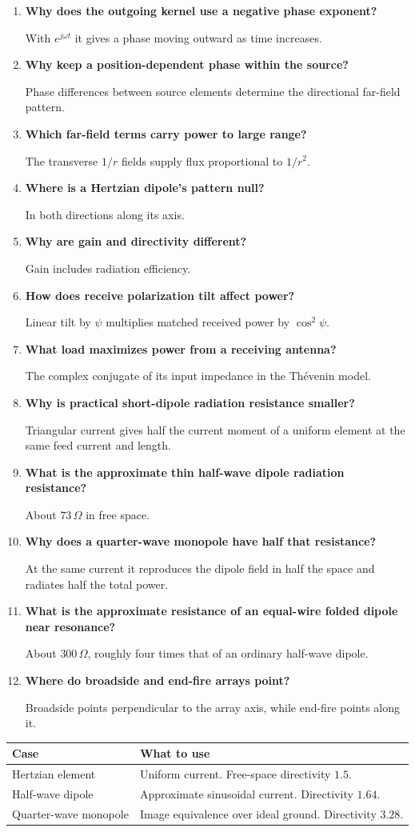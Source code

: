 \documentclass[12pt,a4paper]{article}
\newcommand{\Q}[1]{\textbf{#1}\par\noindent\ignorespaces}
\begin{document}
\begin{tcolorbox}[exambox,title={Frequently Asked / Viva Questions}]
\begin{enumerate}[topsep=0pt, label=\textbf{Q\arabic*.}, itemsep=5pt]
\item \Q{Why does the outgoing kernel use a negative phase exponent?}
With $e^{j\omega t}$ it gives a phase moving outward as time increases.
\item \Q{Why keep a position-dependent phase within the source?}
Phase differences between source elements determine the directional far-field pattern.
\item \Q{Which far-field terms carry power to large range?}
The transverse $1/r$ fields supply flux proportional to $1/r^2$.
\item \Q{Where is a Hertzian dipole's pattern null?}
In both directions along its axis.
\item \Q{Why are gain and directivity different?}
Gain includes radiation efficiency.
\item \Q{How does receive polarization tilt affect power?}
Linear tilt by $\psi$ multiplies matched received power by $\cos^2\psi$.
\item \Q{What load maximizes power from a receiving antenna?}
The complex conjugate of its input impedance in the Th\'evenin model.
\item \Q{Why is practical short-dipole radiation resistance smaller?}
Triangular current gives half the current moment of a uniform element at the same feed current and length.
\item \Q{What is the approximate thin half-wave dipole radiation resistance?}
About $73\,\Omega$ in free space.
\item \Q{Why does a quarter-wave monopole have half that resistance?}
At the same current it reproduces the dipole field in half the space and radiates half the total power.
\item \Q{What is the approximate resistance of an equal-wire folded dipole near resonance?}
About $300\,\Omega$, roughly four times that of an ordinary half-wave dipole.
\item \Q{Where do broadside and end-fire arrays point?}
Broadside points perpendicular to the array axis, while end-fire points along it.
\end{enumerate}
\end{tcolorbox}
\begin{tcolorbox}[tikzbox,title={Summary comparison}]
\begin{tabularx}{\linewidth}{|B{4cm}|Y|}\hline
\textbf{Case} & \textbf{What to use} \\ \hline
Hertzian element & Uniform current. Free-space directivity $1.5$. \\ \hline
Half-wave dipole & Approximate sinusoidal current. Directivity $1.64$. \\ \hline
Quarter-wave monopole & Image equivalence over ideal ground. Directivity $3.28$. \\ \hline
\end{tabularx}
\end{tcolorbox}
\end{document}

